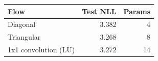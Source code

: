 \begin{tabular}{lrr}
\hline
Flow & Test NLL & Params \\
\hline
Diagonal & 3.382 & 4 \\
Triangular & 3.268 & 8 \\
1x1 convolution (LU) & 3.272 & 14 \\
\hline
\end{tabular}
